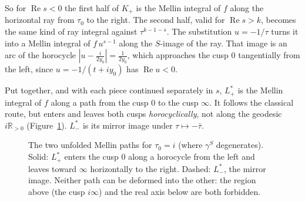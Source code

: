 \documentclass[11pt]{article}
\theoremstyle{definition}
\theoremstyle{remark}
\newcommand{\RR}{\mathbb{R}}
\begin{document}
So for $\operatorname{Re}s<0$ the first half of $K_+$ is the Mellin integral of $f$ along
the horizontal ray from $\tau_0$ to the right. The second half, valid for
$\operatorname{Re}s>k$, becomes the same kind of ray integral against $\tau^{k-1-s}$.
The substitution $u=-1/\tau$ turns it into a Mellin integral of $f\,u^{s-1}$ along the
$S$-image of the ray. That image is an arc of the horocycle $|u-\tfrac{i}{2y_0}|=\tfrac1{2y_0}$,
which approaches the cusp $0$ tangentially from the left, since
$u=-1/(t+iy_0)$ has $\operatorname{Re}u<0$.

Put together, and with each piece continued separately in $s$, $L^*_+$ is the Mellin
integral of $f$ along a path from the cusp $0$ to the cusp $\infty$. It follows the
classical route, but enters and leaves both cusps \emph{horocyclically}, not along
the geodesic $i\RR_{>0}$ (Figure~\ref{fig:paths}). $L^*_-$ is its mirror image under
$\tau\mapsto-\bar\tau$.

\begin{figure}[t]
\centering
{}
\caption{The two unfolded Mellin paths for $\tau_0=i$ (where $\gamma^S$ degenerates).
Solid: $L^*_+$ enters the cusp $0$ along a horocycle from the left and leaves toward
$\infty$ horizontally to the right. Dashed: $L^*_-$, the mirror image. Neither path can
be deformed into the other: the region above (the cusp $i\infty$) and the real axis
below are both forbidden.}
\label{fig:paths}
\end{figure}
\end{document}
